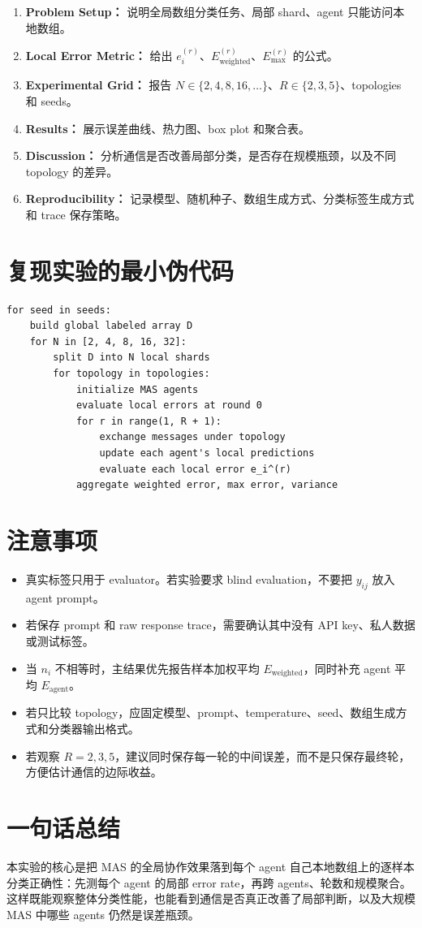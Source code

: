 \documentclass[UTF8,11pt,a4paper,fontset=fandol]{ctexart}
\begin{document}
\begin{enumerate}
  \item \textbf{Problem Setup：} 说明全局数组分类任务、局部 shard、agent 只能访问本地数组。
  \item \textbf{Local Error Metric：} 给出 \(e_i^{(r)}\)、\(E_{\mathrm{weighted}}^{(r)}\)、\(E_{\max}^{(r)}\) 的公式。
  \item \textbf{Experimental Grid：} 报告 \(N\in\{2,4,8,16,\ldots\}\)、\(R\in\{2,3,5\}\)、topologies 和 seeds。
  \item \textbf{Results：} 展示误差曲线、热力图、box plot 和聚合表。
  \item \textbf{Discussion：} 分析通信是否改善局部分类，是否存在规模瓶颈，以及不同 topology 的差异。
  \item \textbf{Reproducibility：} 记录模型、随机种子、数组生成方式、分类标签生成方式和 trace 保存策略。
\end{enumerate}

\section{复现实验的最小伪代码}

\begin{tcolorbox}[
  colback=SoftGreen,
  colframe=green!45!black,
  boxrule=0.5pt,
  arc=2mm,
  left=1em,
  right=1em,
  top=0.8em,
  bottom=0.8em
]
\small
\begin{verbatim}
for seed in seeds:
    build global labeled array D
    for N in [2, 4, 8, 16, 32]:
        split D into N local shards
        for topology in topologies:
            initialize MAS agents
            evaluate local errors at round 0
            for r in range(1, R + 1):
                exchange messages under topology
                update each agent's local predictions
                evaluate each local error e_i^(r)
            aggregate weighted error, max error, variance
\end{verbatim}
\end{tcolorbox}

\section{注意事项}

\begin{itemize}
  \item 真实标签只用于 evaluator。若实验要求 blind evaluation，不要把 \(y_{ij}\) 放入 agent prompt。
  \item 若保存 prompt 和 raw response trace，需要确认其中没有 API key、私人数据或测试标签。
  \item 当 \(n_i\) 不相等时，主结果优先报告样本加权平均 \(E_{\mathrm{weighted}}\)，同时补充 agent 平均 \(E_{\mathrm{agent}}\)。
  \item 若只比较 topology，应固定模型、prompt、temperature、seed、数组生成方式和分类器输出格式。
  \item 若观察 \(R=2,3,5\)，建议同时保存每一轮的中间误差，而不是只保存最终轮，方便估计通信的边际收益。
\end{itemize}

\section{一句话总结}

本实验的核心是把 MAS 的全局协作效果落到每个 agent 自己本地数组上的逐样本分类正确性：先测每个 agent 的局部 error rate，再跨 agents、轮数和规模聚合。这样既能观察整体分类性能，也能看到通信是否真正改善了局部判断，以及大规模 MAS 中哪些 agents 仍然是误差瓶颈。
\end{document}
